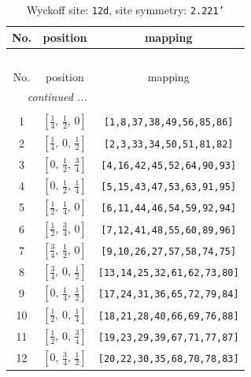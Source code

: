 \documentclass[fleqn,8pt]{jsarticle}
\begin{document}
\begin{longtable}{ccc}
\caption{Wyckoff site: {\tt 12d}, site symmetry: {\tt 2.221'}}
 \\
 \hline \hline
No. & position & mapping \\ \hline \endfirsthead

\multicolumn{2}{l}{\tablename\ \thetable{}} \\
 \hline \hline
No. & position & mapping \\ \hline \endhead

 \hline \hline
\multicolumn{2}{r}{\footnotesize\it continued ...} \\ \endfoot

 \hline \hline
\multicolumn{2}{r}{} \\ \endlastfoot

1 & $\left[ \frac{1}{4},\, \frac{1}{2},\, 0 \right]$ & {\tt [1,8,37,38,49,56,85,86]} \\ \hline
2 & $\left[ \frac{1}{4},\, 0,\, \frac{1}{2} \right]$ & {\tt [2,3,33,34,50,51,81,82]} \\ \hline
3 & $\left[ 0,\, \frac{1}{2},\, \frac{3}{4} \right]$ & {\tt [4,16,42,45,52,64,90,93]} \\ \hline
4 & $\left[ 0,\, \frac{1}{2},\, \frac{1}{4} \right]$ & {\tt [5,15,43,47,53,63,91,95]} \\ \hline
5 & $\left[ \frac{1}{2},\, \frac{1}{4},\, 0 \right]$ & {\tt [6,11,44,46,54,59,92,94]} \\ \hline
6 & $\left[ \frac{1}{2},\, \frac{3}{4},\, 0 \right]$ & {\tt [7,12,41,48,55,60,89,96]} \\ \hline
7 & $\left[ \frac{3}{4},\, \frac{1}{2},\, 0 \right]$ & {\tt [9,10,26,27,57,58,74,75]} \\ \hline
8 & $\left[ \frac{3}{4},\, 0,\, \frac{1}{2} \right]$ & {\tt [13,14,25,32,61,62,73,80]} \\ \hline
9 & $\left[ 0,\, \frac{1}{4},\, \frac{1}{2} \right]$ & {\tt [17,24,31,36,65,72,79,84]} \\ \hline
10 & $\left[ \frac{1}{2},\, 0,\, \frac{1}{4} \right]$ & {\tt [18,21,28,40,66,69,76,88]} \\ \hline
11 & $\left[ \frac{1}{2},\, 0,\, \frac{3}{4} \right]$ & {\tt [19,23,29,39,67,71,77,87]} \\ \hline
12 & $\left[ 0,\, \frac{3}{4},\, \frac{1}{2} \right]$ & {\tt [20,22,30,35,68,70,78,83]} \\
\end{longtable}
\renewcommand{\arraystretch}{1.2}
\end{document}
